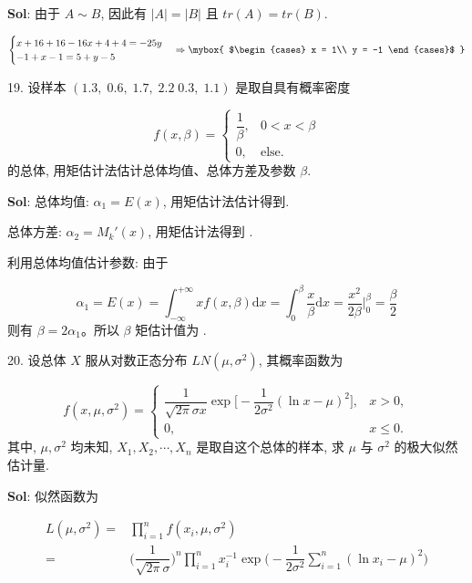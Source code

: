 \textbf{Sol}: 由于 $A\sim B$, 因此有 $|A|=|B|$ 且 $tr(A) = tr(B)$.

$$
\begin{cases}
    x+16+16-16x+4+4=-25y\\
    -1+x-1=5+y-5
\end{cases}
\Rightarrow
\mybox{
$\begin{cases}
    x = 1\\
    y = -1
\end{cases}$
}
$$

\vspace{12pt}

19. 设样本 $(1.3,\;0.6,\;1.7,\;2.2\;0.3,\;1.1)$ 是取自具有概率密度

$$
f(x,\beta)=\begin{cases}
\dfrac{1}{\beta},&0<x<\beta\\
0,&\text{else}.
\end{cases}
$$
的总体, 用矩估计法估计总体均值、总体方差及参数 $\beta$.

\textbf{Sol}:
总体均值: $\alpha_1=E(x)$, 用矩估计法估计得到.\par
总体方差: $\alpha_2=M_k'(x)$, 用矩估计法得到 .\par
利用总体均值估计参数: 由于

$$
\alpha_1=E(x)=\int_{-\infty}^{+\infty}xf(x,\beta)\text{d}x=\int_0^{\beta}\dfrac{x}{\beta}\text{d}x=\dfrac{x^2}{2\beta}\Bigg|_{0}^{\beta}=\dfrac{\beta}{2}
$$
则有 $\beta=2\alpha_1$。所以 $\beta$ 矩估计值为 .

\vspace{12pt}

20. 设总体 $X$ 服从对数正态分布 $LN(\mu,\sigma^2)$, 其概率函数为

$$
f(x,\mu,\sigma^2)=\begin{cases}
    \dfrac{1}{\sqrt{2\pi}\sigma x}\exp\Bigg[-\dfrac{1}{2\sigma^2}(\ln x-\mu)^2\Bigg],&x>0,\\
    0,&x\leqslant0.
\end{cases}
$$
其中, $\mu,\sigma^2$ 均未知, $X_1,X_2,\cdots,X_n$ 是取自这个总体的样本, 求 $\mu$ 与 $\sigma^2$ 的极大似然估计量.

\textbf{Sol}: 似然函数为

$$
\begin{aligned}
    L(\mu,\sigma^2)
=&\prod_{i=1}^nf(x_i,\mu,\sigma^2)\\
=&\Big(\dfrac{1}{\sqrt{2\pi}\sigma}\Big)^n
\prod_{i=1}^nx_i^{-1}
\exp \Big(-\dfrac{1}{2\sigma^2}\sum_{i=1}^n(\ln x_i-\mu)^2\Big)
\end{aligned}
$$

